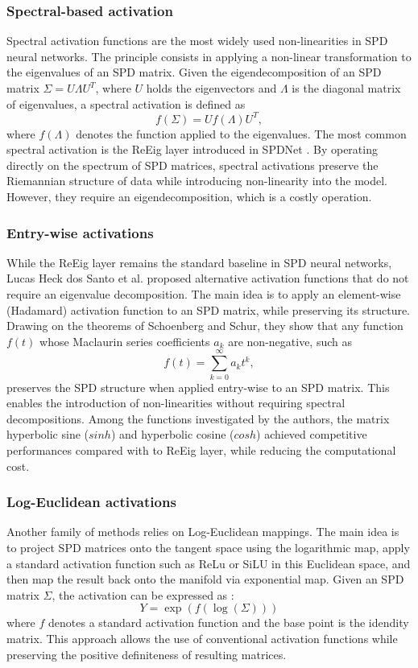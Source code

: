 \documentclass[11pt,a4paper]{article}
\begin{document}
\subsubsection{Spectral-based activation}
Spectral activation functions are the most widely used non-linearities in SPD neural networks. The principle consists in applying a non-linear transformation to the eigenvalues of an SPD matrix. Given the eigendecomposition of an SPD matrix $\Sigma = U\Lambda U^T$, where $U$ holds the eigenvectors and $\Lambda$ is the diagonal matrix of eigenvalues, a spectral activation is defined as \[ f(\Sigma) = Uf(\Lambda)U^T,\] where $f(\Lambda)$ denotes the function applied to the eigenvalues. 
The most common spectral activation is the ReEig layer introduced in SPDNet \cite{spdnet}. By operating directly on the spectrum of SPD matrices, spectral activations preserve the Riemannian structure of data while introducing non-linearity into the model. However, they require an eigendecomposition, which is a costly operation.


\subsubsection{Entry-wise activations}
While the ReEig layer remains the standard baseline in SPD neural networks, Lucas Heck dos Santo et al. \cite{act} proposed alternative activation functions that do not require an eigenvalue decomposition. The main idea is to apply an element-wise (Hadamard) activation function to an SPD matrix, while preserving its structure. Drawing on the theorems of Schoenberg and Schur, they show that any function $f(t)$ whose Maclaurin series coefficients $a_k$ are non-negative, such as \[ f(t) = \sum_{k=0}^{\infty} a_k t^k, \] preserves the SPD structure when applied entry-wise to an SPD matrix.  This enables the introduction of non-linearities without requiring spectral decompositions. 
\noindent Among the functions investigated by the authors, the matrix hyperbolic sine ($sinh$) and hyperbolic cosine ($cosh$) achieved competitive performances compared with to ReEig layer, while reducing the computational cost.

\subsubsection{Log-Euclidean activations}
Another family of methods relies on Log-Euclidean mappings. The main idea is to project SPD matrices onto the tangent space using the logarithmic map, apply a standard activation function such as ReLu or SiLU in this Euclidean space, and then map the result back onto the manifold via exponential map. Given an SPD matrix $\Sigma$, the activation can be expressed as : \[ Y = \exp(f(\log(\Sigma)))\] where $f$ denotes a standard activation function and the base point is the idendity matrix. This approach allows the use of conventional activation functions while preserving the positive definiteness of resulting matrices.  
\newline
\end{document}
